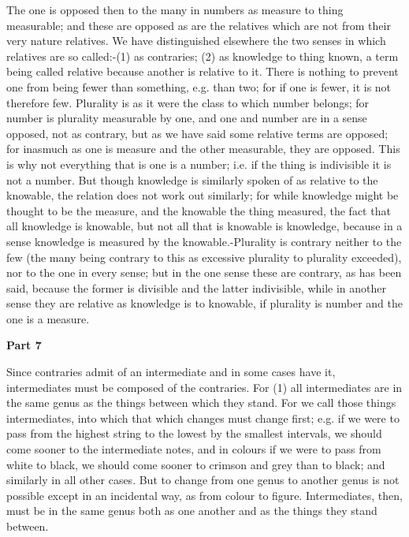 The one is opposed then to the many in numbers as measure to thing measurable; and these are opposed as are the relatives which are not from their very nature relatives. We have distinguished elsewhere the two senses in which relatives are so called:-(1) as contraries; (2) as knowledge to thing known, a term being called relative because another is relative to it. There is nothing to prevent one from being fewer than something, e.g. than two; for if one is fewer, it is not therefore few. Plurality is as it were the class to which number belongs; for number is plurality measurable by one, and one and number are in a sense opposed, not as contrary, but as we have said some relative terms are opposed; for inasmuch as one is measure and the other measurable, they are opposed. This is why not everything that is one is a number; i.e. if the thing is indivisible it is not a number. But though knowledge is similarly spoken of as relative to the knowable, the relation does not work out similarly; for while knowledge might be thought to be the measure, and the knowable the thing measured, the fact that all knowledge is knowable, but not all that is knowable is knowledge, because in a sense knowledge is measured by the knowable.-Plurality is contrary neither to the few (the many being contrary to this as excessive plurality to plurality exceeded), nor to the one in every sense; but in the one sense these are contrary, as has been said, because the former is divisible and the latter indivisible, while in another sense they are relative as knowledge is to knowable, if plurality is number and the one is a measure.

\textbf{Part 7}

Since contraries admit of an intermediate and in some cases have it, intermediates must be composed of the contraries. For (1) all intermediates are in the same genus as the things between which they stand. For we call those things intermediates, into which that which changes must change first; e.g. if we were to pass from the highest string to the lowest by the smallest intervals, we should come sooner to the intermediate notes, and in colours if we were to pass from white to black, we should come sooner to crimson and grey than to black; and similarly in all other cases. But to change from one genus to another genus is not possible except in an incidental way, as from colour to figure. Intermediates, then, must be in the same genus both as one another and as the things they stand between.

